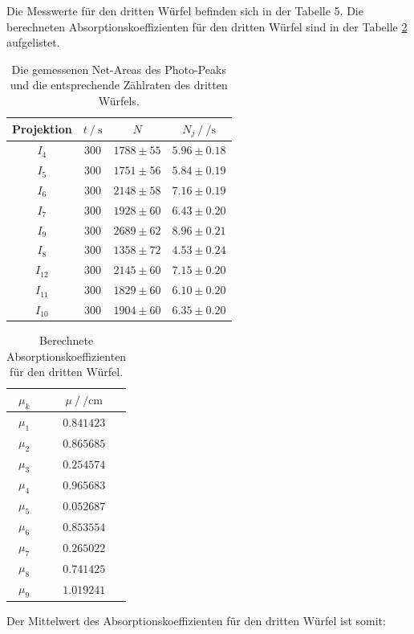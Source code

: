 Die Messwerte für den dritten Würfel befinden sich in der Tabelle 5. 
Die berechneten Absorptionskoeffizienten für den dritten Würfel sind in der Tabelle \ref{tab:w3_mu} aufgelistet. 

\begin{table}[H]
  \centering
  \begin{tabular}{c c c c}
    \toprule
    Projektion &  $t \:/\: \si{\second}$ &     $N$ &           $N_j \:/\: \si{\per\second}$ \\
    \midrule
             $I_{ 4}$ &   $300$ & $1788 \pm   55$ & $5.96\pm0.18$ \\
             $I_{ 5}$ &   $300$ & $1751 \pm   56$ & $5.84\pm0.19$ \\
             $I_{ 6}$ &   $300$ & $2148 \pm   58$ & $7.16\pm0.19$ \\
             $I_{ 7}$ &   $300$ & $1928 \pm   60$ & $6.43\pm0.20$ \\
             $I_{ 9}$ &   $300$ & $2689 \pm   62$ & $8.96\pm0.21$ \\
             $I_{ 8}$ &   $300$ & $1358 \pm   72$ & $4.53\pm0.24$ \\
             $I_{12}$ &   $300$ & $2145 \pm   60$ & $7.15\pm0.20$ \\
             $I_{11}$ &   $300$ & $1829 \pm   60$ & $6.10\pm0.20$ \\
             $I_{10}$ &   $300$ & $1904 \pm   60$ & $6.35\pm0.20$ \\
    \bottomrule
  \end{tabular}
  \caption{Die gemessenen Net-Areas des Photo-Peaks und die entsprechende Zählraten des dritten Würfels. }
  \label{tab:w3}
\end{table}


\begin{table}[H]
  \centering
  \begin{tabular}{c c}
    \toprule
     $\mu_k$ &  $\mu \:/\: \si{\per\centi\metre}$ \\
    \midrule
            $\mu_{  1}$ &   $ 0.841423$ \\
            $\mu_{  2}$ &   $ 0.865685$ \\
            $\mu_{  3}$ &   $ 0.254574$ \\
            $\mu_{  4}$ &   $ 0.965683$ \\
            $\mu_{  5}$ &   $ 0.052687$ \\
            $\mu_{  6}$ &   $ 0.853554$ \\
             $\mu_{ 7}$ &   $ 0.265022$ \\
             $\mu_{ 8}$ &   $ 0.741425$ \\
             $\mu_{ 9}$ &   $ 1.019241$ \\
    \bottomrule
    \end{tabular}
  \caption{Berechnete Absorptionskoeffizienten für den dritten Würfel. }
  \label{tab:w3_mu}
\end{table}
Der Mittelwert des Absorptionskoeffizienten für den dritten Würfel ist somit:

